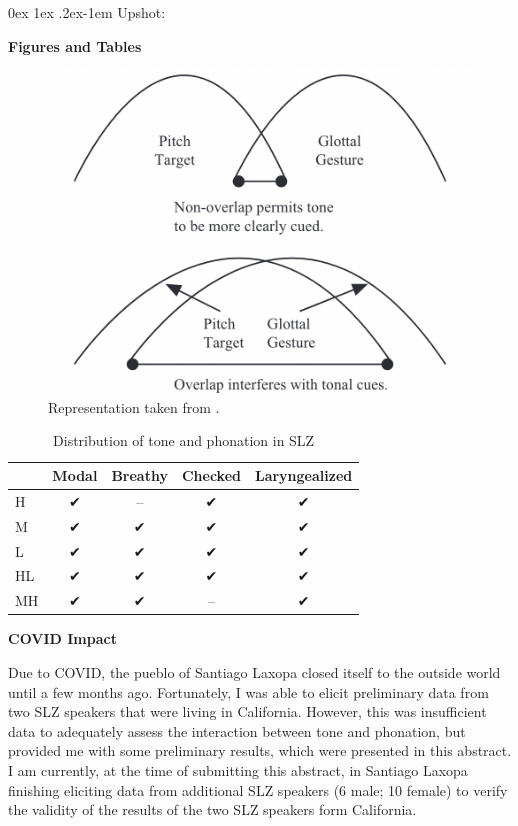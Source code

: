 \documentclass[12pt, letterpaper]{article}
\makeatletter
\renewcommand{\paragraph}{%
  \@startsection{paragraph}{4}%
  {\z@}{0ex \@plus 1ex \@minus .2ex}{-1em}%
  {\normalfont\normalsize\bfseries}%
}
\makeatother
\begin{document}
\paragraph{Upshot:}




\newpage
\begin{center}
	\textbf{Figures and Tables}
\end{center}
\thispagestyle{empty}
\begin{figure}[!ht]
	\centering
	\includegraphics[width=.5\textwidth]{../Gestures.png}
	\caption{Representation taken from \citet{dicanioCoarticulationToneGlottal2012}.}
	\label{fig:GlottalGestures}
\end{figure}

\begin{table}[!h]
	\caption{Distribution of tone and phonation in SLZ}
	\label{tab:ToneVoiceQuality}
	\centering
	\begin{tabular}{lcccc}
	\hline
	\hline
		& \textbf{Modal} & \textbf{Breathy} & \textbf{Checked} & \textbf{Laryngealized} \\
	\hline
	H	& ✔ & -- & ✔ & ✔ \\
	M	& ✔ & ✔ & ✔ & ✔\\
	L	& ✔	& ✔ & ✔ & ✔\\
	HL	& ✔	& ✔ & ✔ & ✔\\
	MH	& ✔	& ✔ & -- & ✔ \\
	\hline
	\hline
	\end{tabular}
\end{table}

\newpage
\begin{center}
	\textbf{COVID Impact}
\end{center}
\thispagestyle{empty}
Due to COVID, the pueblo of Santiago Laxopa closed itself to the outside world until a few months ago. Fortunately, I was able to elicit preliminary data from two SLZ speakers that were living in California. However, this was insufficient data to adequately assess the interaction between tone and phonation, but provided me with some preliminary results, which were presented in this abstract. I am currently, at the time of submitting this abstract, in Santiago Laxopa finishing eliciting data from additional SLZ speakers (6 male; 10 female) to verify the validity of the results of the two SLZ speakers form California. 

\end{document}
